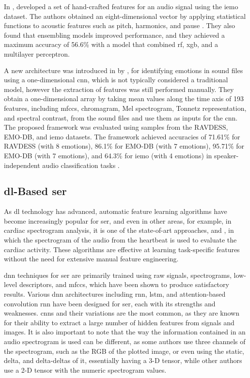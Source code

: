 In \citeyear{HandCraftedSahu}, \citeauthor{HandCraftedSahu} developed a set of hand-crafted features for an audio signal using the \ac{iemo} dataset. The authors obtained an eight-dimensional vector by applying statistical functions to acoustic features such as pitch, harmonics, and pause \cite{HandCraftedSahu}. They also found that ensembling models improved performance, and they achieved a maximum accuracy of 56.6\% with a model that combined \ac{rf}, \ac{xgb}, and a multilayer perceptron.

A new architecture was introduced in \citeyear{Issa2020} by \citeauthor{Issa2020}, for identifying emotions in sound files using a one-dimensional \ac{cnn}, which is not typically considered a traditional model, however the extraction of features was still performed manually. They obtain a one-dimensional array by taking mean values along the time axis of 193 features, including \ac{mfccs}, chromagram, Mel spectrogram, Tonnetz representation, and spectral contrast, from the sound files and use them as inputs for the \ac{cnn}. The proposed framework was evaluated using samples from the RAVDESS, EMO-DB, and \ac{iemo} datasets. The framework achieved accuracies of 71.61\% for RAVDESS (with 8 emotions), 86.1\% for EMO-DB (with 7 emotions), 95.71\% for EMO-DB (with 7 emotions), and 64.3\% for \ac{iemo} (with 4 emotions) in speaker-independent audio classification tasks \cite{Issa2020}.

\subsection{\acl{dl}-Based \ac{ser}}

As \ac{dl} technology has advanced, automatic feature learning algorithms have become increasingly popular for \ac{ser}, and even in other areas, for example, in cardiac spectrogram analysis, it is one of the state-of-art approaches, \cite{8759878} and \cite{Zhou2022}, in which the spectrogram of the audio from the heartbeat is used to evaluate the cardiac activity. These algorithms are effective at learning task-specific features without the need for extensive manual feature engineering.

\ac{dnn} techniques for \ac{ser} are primarily trained using raw signals, spectrograms, low-level descriptors, and \ac{mfccs}, which have been shown to produce satisfactory results. Various \ac{dnn} architectures including \ac{rnn}, \ac{lstm}, and attention-based convolution \ac{rnn} have been designed for \ac{ser}, each with its strengths and weaknesses. \acp{cnn} and their variations are the most common, as they are known for their ability to extract a large number of hidden features from signals and images. It is also important to note that the way the information contained in an audio spectrogram is used can be different, as some authors use three channels of the spectrogram, such as the RGB of the plotted image, or even using the static, delta, and delta-deltas of it, essentially having a 3-D tensor, while other authors use a 2-D tensor with the numeric spectrogram values.

